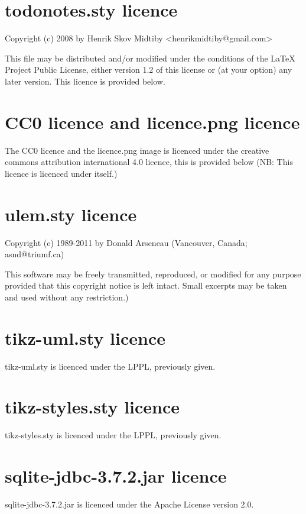 \section{todonotes.sty licence}
Copyright (c) 2008 by Henrik Skov Midtiby <henrikmidtiby@gmail.com>

This file may be distributed and/or modified under the conditions of the LaTeX
Project Public License, either version 1.2 of this license or (at your option)
any later version. This licence is provided below.



\section{CC0 licence and licence.png licence}
The CC0 licence and the licence.png image is licenced under the creative commons
attribution international 4.0 licence, this is provided below (NB: This licence
is licenced under itself.)



\section{ulem.sty licence}
Copyright (c) 1989-2011 by Donald Arseneau (Vancouver, Canada; asnd@triumf.ca)

This software may be freely transmitted, reproduced, or modified for any purpose
provided that this copyright notice is left intact. Small excerpts may be taken
and used without any restriction.)

\section{tikz-uml.sty licence}
tikz-uml.sty is licenced under the LPPL, previously given.

\section{tikz-styles.sty licence}
tikz-styles.sty is licenced under the LPPL, previously given.

\section{sqlite-jdbc-3.7.2.jar licence}
sqlite-jdbc-3.7.2.jar is licenced under the Apache License version 2.0.


